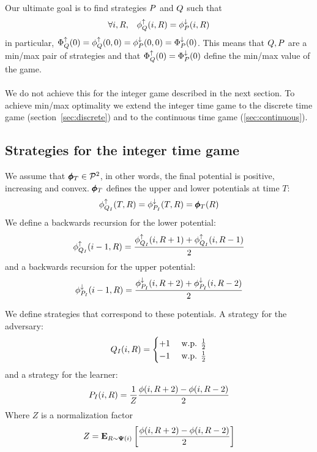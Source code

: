 \documentclass{article}[12pt]
\begin{document}
Our ultimate goal is to find strategies $P$ and
$Q$ such that
\begin{equation} \label{eqn:limitPotential}
\forall i,R,\;\;\; \phi_{Q}^{\uparrow}(i,R) = \phi_{P}^{\downarrow}(i,R)
\end{equation}
in particular, $\Phi_{Q}^{\uparrow}(0)=\phi_{Q}^{\uparrow}(0,0) =
\phi_{P}^{\downarrow}(0,0)=\Phi_{P}^{\downarrow}(0)$. This means that
$Q,P$ are a min/max pair of strategies and that
$\Phi_{Q}^{\uparrow}(0)=\Phi_{P}^{\downarrow}(0)$ define the min/max value of the game.
~\\~\\
We do not achieve this for the integer game described in the next
section. To achieve min/max optimality we extend the integer time game
to the discrete time game (section~\ref{sec:discrete}) and to the
continuous time game (\ref{sec:continuous}).


\subsection{Strategies for the integer time  game} \label{sec:strat-integer}
We assume that $\pmb{\phi}_{T}  \in {\cal P}^{2}$, in other words, the final
potential is positive, increasing and convex. $\pmb{\phi}_{T}$ defines the
upper and lower potentials at time $T$:
$$\phi_{Q_I}^{\uparrow}(T,R) = \phi_{P_I}^{\downarrow}(T,R) = \pmb{\phi}_{T}(R) $$
We define a backwards recursion for the lower potential:
\begin{equation} \label{eqn:backward-iteration-lower}
  \phi_{Q_I}^{\uparrow}(i-1, R) = \frac{\phi_{Q_I}^{\uparrow}(i,R+1) + \phi_{Q_I}^{\uparrow}(i,R-1)}{2}
\end{equation}
and a backwards recursion for the upper potential:
\begin{equation} \label{eqn:backward-iteration-upper-recursion}
  \phi_{P_I}^{\downarrow}(i-1, R) = \frac{\phi_{P_I}^{\downarrow}(i,R+2) + \phi_{P_I}^{\downarrow}(i,R-2)}{2}
\end{equation}

We define strategies that correspond to these potentials. A strategy
for the adversary:
\begin{equation} \label{eqn:adv-strat-p}
  Q_I(i,R) =
  \begin{cases}
    +1 & \mbox{ w.p. } \frac{1}{2}\\
    -1 & \mbox{ w.p. } \frac{1}{2}\\
  \end{cases}
\end{equation}
and a strategy for the learner:
\begin{equation} \label{eqn:learner-strat-1}
P_I(i,R) = \frac{1}{Z} \frac{\phi(i,R+2) - \phi(i,R-2)}{2}
\end{equation}
Where $Z$ is a normalization factor
$$Z = {\bf E}_{R \sim {\bf \Psi}(i)}\left[ \frac{\phi(i,R+2) - \phi(i,R-2)}{2} \right]$$
\end{document}
